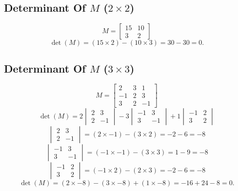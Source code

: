 \documentclass{article}
\begin{document}
\subsection*{Determinant Of  \(M\)  (\(2 \times 2\))}
\[
M = \begin{bmatrix} 15 & 10 \\ 3 & 2 \end{bmatrix}
\]
\[
\det(M) = (15 \times 2) - (10 \times 3) = 30 - 30 = 0.
\]



\subsection*{Determinant Of  \(M\)  (\(3 \times 3\))}
\[
M = \begin{bmatrix} 2 & 3 & 1 \\ -1 & 2 & 3 \\ 3 & 2 & -1 \end{bmatrix}
\]
\[
\det(M) = 2 \begin{vmatrix} 2 & 3 \\ 2 & -1 \end{vmatrix} - 3 \begin{vmatrix} -1 & 3 \\ 3 & -1 \end{vmatrix} + 1 \begin{vmatrix} -1 & 2 \\ 3 & 2 \end{vmatrix}
\]
\[
\begin{vmatrix} 2 & 3 \\ 2 & -1 \end{vmatrix} = (2 \times -1) - (3 \times 2) = -2 - 6 = -8
\]
\[
\begin{vmatrix} -1 & 3 \\ 3 & -1 \end{vmatrix} = (-1 \times -1) - (3 \times 3) = 1 - 9 = -8
\]
\[
\begin{vmatrix} -1 & 2 \\ 3 & 2 \end{vmatrix} = (-1 \times 2) - (2 \times 3) = -2 - 6 = -8
\]
\[
\det(M) = (2 \times -8) - (3 \times -8) + (1 \times -8) = -16 + 24 - 8 = 0.
\]



\newpage
\end{document}
